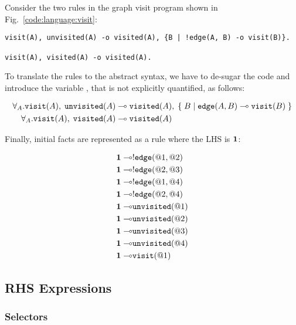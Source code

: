 Consider the two rules in the graph visit program shown in
Fig.~\ref{code:language:visit}:

\nopagebreak

\begin{Verbatim}[fontsize=\codesize]
visit(A), unvisited(A) -o visited(A), {B | !edge(A, B) -o visit(B)}.

visit(A), visited(A) -o visited(A).
\end{Verbatim}

To translate the rules to the abstract syntax, we have to de-sugar the code and
introduce the variable , that is not explicitly quantified, as follows:

\nopagebreak

\begin{align}
\forall_A. \mathtt{visit}(A), \; \mathtt{unvisited}(A) \multimap & \;
\mathtt{visited}(A), \; \{ \; B \; | \; \mathtt{edge}(A, B) \multimap \mathtt{visit}(B) \; \}\\
\forall_A. \mathtt{visit}(A), \; \mathtt{visited}(A) \multimap & \;
\mathtt{visited}(A)
\end{align}

Finally, initial facts are represented as a rule where the LHS is $\mathbf{1}$:

\nopagebreak

\begin{align}
\mathbf{1} \multimap & {!} \mathtt{edge}(@1, @2) \\
\mathbf{1} \multimap & {!} \mathtt{edge}(@2, @3) \\
\mathbf{1} \multimap & {!} \mathtt{edge}(@1, @4) \\
\mathbf{1} \multimap & {!} \mathtt{edge}(@2, @4) \\
\mathbf{1} \multimap & \mathtt{unvisited}(@1)  \\
\mathbf{1} \multimap & \mathtt{unvisited}(@2) \\
\mathbf{1} \multimap & \mathtt{unvisited}(@3) \\
\mathbf{1} \multimap & \mathtt{unvisited}(@4) \\
\mathbf{1} \multimap & \mathtt{visit}(@1)
\end{align}

\subsection{RHS Expressions}\label{section:language:expressions}

\subsubsection{Selectors}

